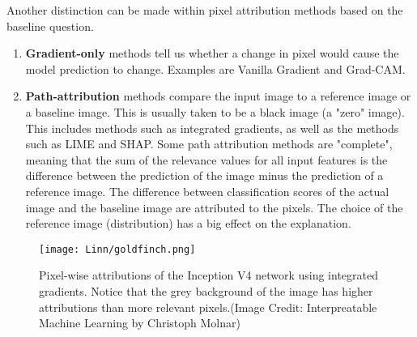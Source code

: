 \documentclass{../template/texnote}
\begin{document}
Another distinction can be made within pixel attribution methods based on the baseline question.
\begin{enumerate}
    \item \textbf{Gradient-only} methods tell us whether a change in pixel would cause the model prediction to change.
        Examples are Vanilla Gradient and Grad-CAM.
    \item \textbf{Path-attribution} methods compare the input image to a reference image or a baseline image. This is usually taken to be a black image (a "zero" image).
        This includes methods such as integrated gradients, as well as the methods such as LIME and SHAP.
Some path attribution methods are "complete", meaning that the sum of the relevance values for all input features is the difference between the prediction of the image minus the prediction of a reference image.
The difference between classification scores of the actual image and the baseline image are attributed to the pixels. The choice of the reference image (distribution) has a big effect on the explanation.
\end{enumerate}

\begin{figure}[htpb]
    \centering
    \texttt{[image: Linn/goldfinch.png]}
    \caption{Pixel-wise attributions of the Inception V4 network using integrated gradients. Notice that the grey background of the image has higher attributions than more relevant pixels.(Image Credit: Interpreatable Machine Learning by Christoph Molnar)}
    \label{fig:goldfinch}
\end{figure}



\end{document}
